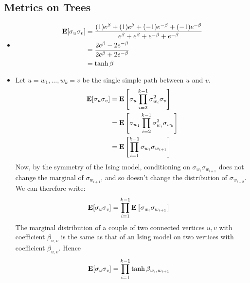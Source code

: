 \documentclass[11pt]{article} \usepackage{amssymb}
\newcommand{\E}{{\bf E}} \newcommand{\Cov}{{\bf Cov}}
\begin{document}
\subsection{Metrics on Trees}
\begin{itemize}
\item
  \begin{align*}
    \E[\sigma_u\sigma_v] &=
    {(1)e^\beta + (1)e^\beta + (-1)e^{-\beta} + (-1)e^{-\beta}
      \over
    e^\beta + e^\beta + e^{-\beta} +e^{-\beta}}
  \\ &=     {2e^\beta - 2e^{-\beta}
      \over
    2e^\beta + 2e^{-\beta}}
  \\ &= \tanh\beta
  \end{align*}
  
\item
  Let $u=w_1,\ldots,w_k=v$ be the single simple path between $u$ and $v$.
  \begin{align*}
    \E[\sigma_u\sigma_v] &=
    \E\left[\sigma_u\prod_{i=2}^{k-1}\sigma_{w_i}^2\sigma_v\right]
      \\ &= \E\left[\sigma_{w_1}\prod_{i=2}^{k-1}\sigma_{w_i}^2\sigma_{w_k}\right]
      \\ &= \E\left[\prod_{i=1}^{k-1}\sigma_{w_i}\sigma_{w_{i+1}}\right]
  \end{align*}
  Now, by the symmetry of the Ising model, conditioning on
  $\sigma_{w_i}\sigma_{w_{i+1}}$ does not change the marginal of
  $\sigma_{w_{i+1}}$, and so doesn't change the distribution of
  $\sigma_{w_{i+2}}$. We can therefore write:
  \begin{align*}
    \E[\sigma_u\sigma_v] &= \prod_{i=1}^{k-1}\E\left[\sigma_{w_i}\sigma_{w_{i+1}}\right]
  \end{align*}
  The marginal distribution of a couple of two connected vertices
  $u,v$ with coefficient $\beta_{u,v}$ is the same as that of an Ising
  model on two vertices with coefficient $\beta_{u,v}$. Hence
  \begin{align*}
    \E[\sigma_u\sigma_v] &= \prod_{i=1}^{k-1}\tanh\beta_{w_i,w_{i+1}}
  \end{align*}
  

\end{itemize}
\end{document}

